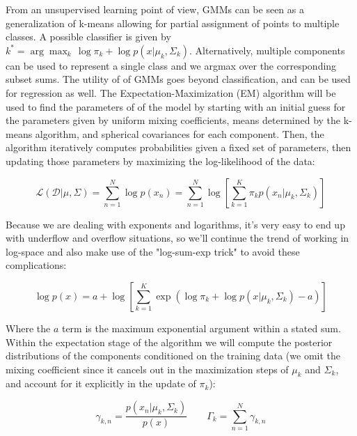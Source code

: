 \documentclass{article}
\begin{document}
From an unsupervised learning point of view, GMMs can be seen as a generalization of k-means allowing for partial assignment of points to multiple classes. A possible classifier is given by $k^{*} = \arg\max_k \, \log \pi_{k} + \log p(x \lvert \mu_k, \Sigma_k)$. Alternatively, multiple components can be used to represent a single class and we argmax over the corresponding subset sums. The utility of of GMMs goes beyond classification, and can be used for regression as well. The Expectation-Maximization (EM) algorithm will be used to find the parameters of of the model by starting with an initial guess for the parameters given by uniform mixing coefficients, means determined by the k-means algorithm, and spherical covariances for each component. Then, the algorithm iteratively computes probabilities given a fixed set of parameters, then updating those parameters by maximizing the log-likelihood of the data:

\begin{equation}
	\mathcal{L} \left( \mathcal{D} \lvert \mu, \Sigma \right) = \sum_{n = 1}^{N} \log p(x_n) = \sum_{n=1}^{N} \log{ \left [ \sum_{k = 1}^{K} \pi_{k} p \left( x_n \lvert \mu_k, \Sigma_k \right ) \right ] }
	\label{eqn:loglikelihood}
\end{equation}

Because we are dealing with exponents and logarithms, it's very easy to end up with underflow and overflow situations, so we'll continue the trend of working in log-space and also make use of the "log-sum-exp trick" to avoid these complications:

\begin{equation}
	\log p( x ) = a + \log \left[ \sum_{k = 1}^{K} \exp{ \left( \log \pi_{k} + \log p(x \lvert \mu_k, \Sigma_k) - a \right ) } \right ]
\end{equation}

Where the $a$ term is the maximum exponential argument within a stated sum. Within the expectation stage of the algorithm we will compute the posterior distributions of the components conditioned on the training data (we omit the mixing coefficient since it cancels out in the maximization steps of $\mu_k$ and $\Sigma_k$, and account for it explicitly in the update of $\pi_k$):

\begin{equation}
	\gamma_{k, n} = \frac{ p \left ( x_n \lvert \mu_k, \Sigma_k \right ) }{ p(x) } \qquad \Gamma_k = \sum_{n=1}^{N} \gamma_{k, n}
\end{equation}
\end{document}
